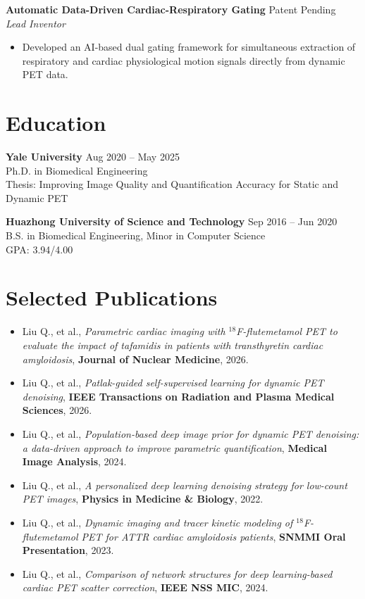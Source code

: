 \textbf{Automatic Data-Driven Cardiac-Respiratory Gating} \hfill Patent Pending \\
\textit{Lead Inventor}
\begin{itemize}[leftmargin=*]
\item Developed an AI-based dual gating framework for simultaneous extraction of respiratory and cardiac physiological motion signals directly from dynamic PET data.
\end{itemize}

\section{Education}
\textbf{Yale University} \hfill Aug 2020 -- May 2025 \\
Ph.D. in Biomedical Engineering \\
Thesis: Improving Image Quality and Quantification Accuracy for Static and Dynamic PET

\textbf{Huazhong University of Science and Technology} \hfill Sep 2016 -- Jun 2020 \\
B.S. in Biomedical Engineering, Minor in Computer Science \\
GPA: 3.94/4.00

\section{Selected Publications}
\begin{itemize}[leftmargin=*]
\item Liu Q., et al., \textit{Parametric cardiac imaging with $^{18}$F-flutemetamol PET to evaluate the impact of tafamidis in patients with transthyretin cardiac amyloidosis}, \textbf{Journal of Nuclear Medicine}, 2026.
\item Liu Q., et al., \textit{Patlak-guided self-supervised learning for dynamic PET denoising}, \textbf{IEEE Transactions on Radiation and Plasma Medical Sciences}, 2026.
\item Liu Q., et al., \textit{Population-based deep image prior for dynamic PET denoising: a data-driven approach to improve parametric quantification}, \textbf{Medical Image Analysis}, 2024.
\item Liu Q., et al., \textit{A personalized deep learning denoising strategy for low-count PET images}, \textbf{Physics in Medicine \& Biology}, 2022.
\item Liu Q., et al., \textit{Dynamic imaging and tracer kinetic modeling of $^{18}$F-flutemetamol PET for ATTR cardiac amyloidosis patients}, \textbf{SNMMI Oral Presentation}, 2023.
\item Liu Q., et al., \textit{Comparison of network structures for deep learning-based cardiac PET scatter correction}, \textbf{IEEE NSS MIC}, 2024.
\end{itemize}

